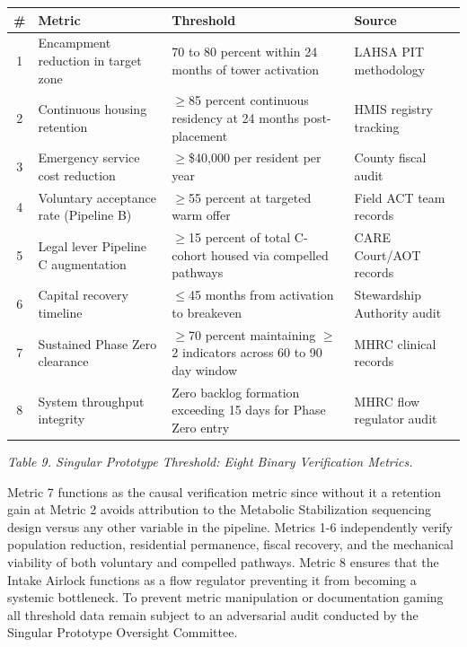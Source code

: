 \documentclass[12pt, letterpaper]{article}
\begin{document}
{\singlespacing
\begin{tabularx}{\textwidth}{@{}cp{4.5cm}Xp{4.2cm}@{}}
\toprule
\rowcolor{rowgray}
\# & Metric & Threshold & Source \\
\midrule
1 & Encampment reduction in target zone & 70 to 80 percent within 24 months of tower activation & LAHSA PIT methodology \\
\rowcolor{rowgray}
2 & Continuous housing retention & $\geq$85 percent continuous residency at 24 months post-placement & HMIS registry tracking \\
3 & Emergency service cost reduction & $\geq$\$40,000 per resident per year & County fiscal audit \\
\rowcolor{rowgray}
4 & Voluntary acceptance rate (Pipeline B) & $\geq$55 percent at targeted warm offer & Field ACT team records \\
5 & Legal lever Pipeline C augmentation & $\geq$15 percent of total C-cohort housed via compelled pathways & CARE Court/AOT records \\
\rowcolor{rowgray}
6 & Capital recovery timeline & $\leq$45 months from activation to breakeven & Stewardship Authority audit \\
7 & Sustained Phase Zero clearance & $\geq$70 percent maintaining $\geq$2 indicators across 60 to 90 day window & MHRC clinical records \\
\rowcolor{rowgray}
8 & System throughput integrity & Zero backlog formation exceeding 15 days for Phase Zero entry & MHRC flow regulator audit \\
\bottomrule
\end{tabularx}\par
\vspace{8pt}
\noindent\textit{Table 9. Singular Prototype Threshold: Eight Binary Verification Metrics.}
\par}

Metric 7 functions as the causal verification metric since without it a retention gain at Metric 2 avoids attribution to the Metabolic Stabilization sequencing design versus any other variable in the pipeline. Metrics 1-6 independently verify population reduction, residential permanence, fiscal recovery, and the mechanical viability of both voluntary and compelled pathways. Metric 8 ensures that the Intake Airlock functions as a flow regulator preventing it from becoming a systemic bottleneck. To prevent metric manipulation or documentation gaming all threshold data remain subject to an adversarial audit conducted by the Singular Prototype Oversight Committee.
\end{document}
